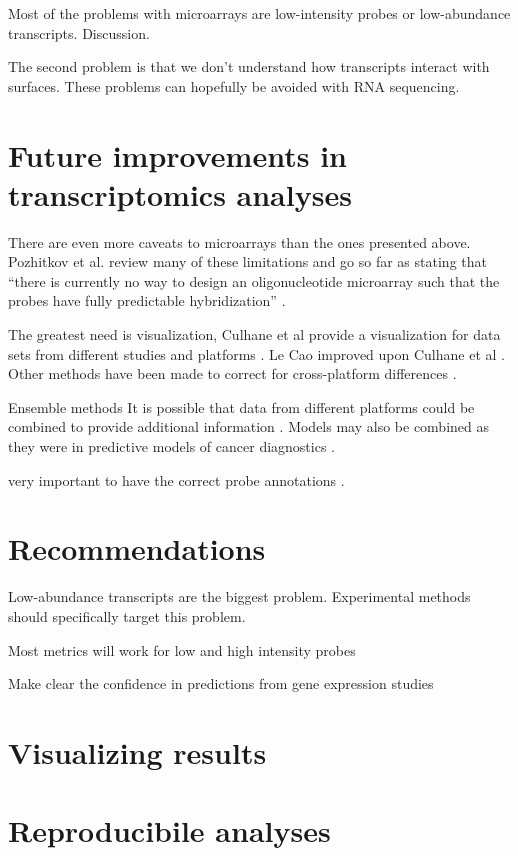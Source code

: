 Most of the problems with microarrays are low-intensity probes or
low-abundance transcripts. Discussion.

The second problem is that we don't understand how transcripts
interact with surfaces. These problems can hopefully be avoided
with RNA sequencing.

\section{Future improvements in transcriptomics analyses}

There are even more caveats to microarrays than the ones presented
above. Pozhitkov et al. review many of these limitations and go
so far as stating that ``there is currently no way to design 
an oligonucleotide microarray such that the probes have 
fully predictable hybridization'' \cite{Pozhitkov:2007go}.


The greatest need is visualization, Culhane et al provide a visualization
for data sets from different studies and platforms \cite{Culhane:2003it}.
Le Cao improved upon Culhane et al \cite{Cao:2009dd}.
Other methods have been made to correct for cross-platform differences \cite{Fan:2011iy}.

Ensemble methods
It is possible that data from different platforms could be combined
to provide additional information \cite{Hockley:2009tf}.
Models may also be combined as they were in predictive models
of cancer diagnostics \cite{Chen:2011ib}.

very important to have the correct probe annotations \cite{Carter:2005bq}.

\section{Recommendations}

Low-abundance transcripts are the biggest problem. Experimental methods should
specifically target this problem.

Most metrics will work for low and high intensity probes

Make clear the confidence in predictions from gene expression studies

\section{Visualizing results}

\section{Reproducibile analyses}

